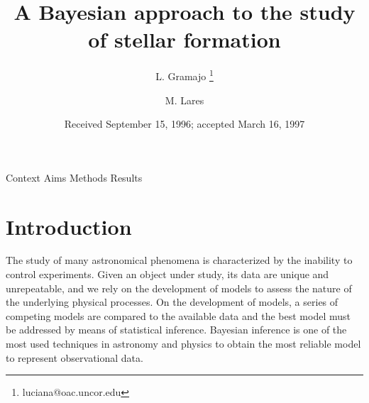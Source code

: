 \documentclass{aa}
\begin{document}
 


   \title{A Bayesian approach to the study of stellar formation}

   \subtitle{}

   \author{L. Gramajo
          \thanks{luciana@oac.uncor.edu}
          \and
          M. Lares
          \fnmsep
          }


             
   \date{Received September 15, 1996; accepted March 16, 1997}

 
  \abstract
   {Context}
   {Aims}
   {Methods}
   {Results}
   {}


   \maketitle




\section{Introduction} \label{S_intro}




The study of many astronomical phenomena is characterized by the inability
to control experiments.
%
Given an object under study, its data are unique and unrepeatable, and
we rely on the development of models to assess the nature of the
underlying physical processes.
%
On the development of models, a series of competing models are
compared to the available data and the best model must be addressed by
means of statistical inference.
%
Bayesian inference is one of the most used techniques in astronomy and
physics to obtain the most reliable model to represent observational
data.
\end{document}
